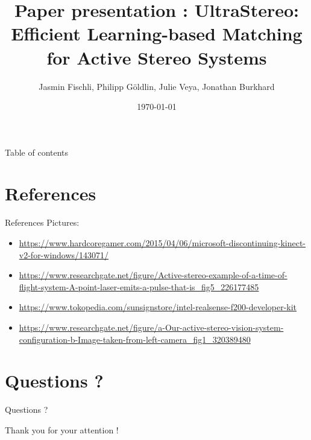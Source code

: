 \documentclass{beamer}
\author{Jasmin Fischli, Philipp Göldlin, Julie Veya, Jonathan Burkhard}
\title{Paper presentation : UltraStereo: Efficient Learning-based Matching for Active Stereo Systems}
\date{\today}
\begin{document}
\frame{\maketitle}
\begin{frame}{Table of contents}{}
	\tableofcontents
\end{frame}

%
%





%
%
\section{References}
\begin{frame}{References}
Pictures:
{\tiny
\begin{itemize}
\item \url{https://www.hardcoregamer.com/2015/04/06/microsoft-discontinuing-kinect-v2-for-windows/143071/}
\item \url{https://www.researchgate.net/figure/Active-stereo-example-of-a-time-of-flight-system-A-point-laser-emits-a-pulse-that-is_fig5_226177485}
\item \url{https://www.tokopedia.com/sunsignstore/intel-realsense-f200-developer-kit}
\item \url{https://www.researchgate.net/figure/a-Our-active-stereo-vision-system-configuration-b-Image-taken-from-left-camera_fig1_320389480}
\end{itemize}
}
\end{frame}

\section{Questions ?}
\begin{frame}{Questions}
\centering
\Huge{?}
\end{frame}

\begin{frame}{}
\centering
\Huge{Thank you for your attention !}
\end{frame}
\end{document}

